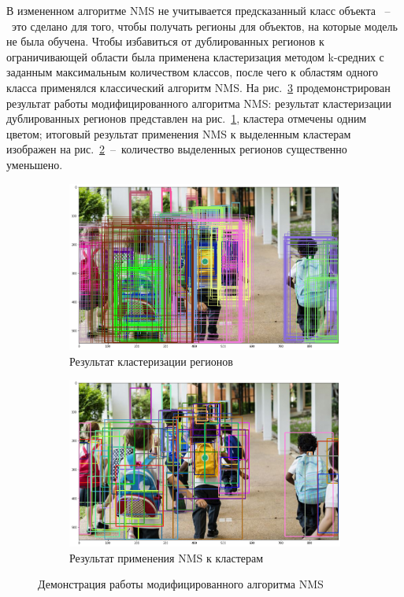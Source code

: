 \documentclass[a4paper,14pt]{article}
\begin{document}
    В измененном алгоритме NMS не учитывается предсказанный класс объекта	~--~это сделано для того, чтобы получать регионы для объектов, на которые модель не была обучена.
    Чтобы избавиться от дублированных регионов к ограничивающей области была применена кластеризация методом k-средних с заданным максимальным количеством классов, после чего к областям одного класса применялся классический алгоритм NMS.
    На рис.~\ref{fig:nms} продемонстрирован результат работы модифицированного алгоритма NMS: результат кластеризации дублированных регионов представлен на рис.~\ref{fig:nms1}, кластера отмечены одним цветом; итоговый результат применения NMS к выделенным кластерам изображен на рис.~\ref{fig:nms2}~--~количество выделенных регионов существенно уменьшено.

    \begin{figure}[H]
        \centering
        \begin{subfigure}{.5\textwidth}
            \centering
            \includegraphics[width=\linewidth]{images/before_nms}
            \caption{Результат кластеризации регионов}
            \label{fig:nms1}
        \end{subfigure}%
        \begin{subfigure}{.5\textwidth}
            \centering
            \includegraphics[width=\linewidth]{images/after_nms}
            \caption{Результат применения NMS к кластерам}
            \label{fig:nms2}
        \end{subfigure}
        \caption{Демонстрация работы модифицированного алгоритма NMS}
        \label{fig:nms}
    \end{figure}
\end{document}
